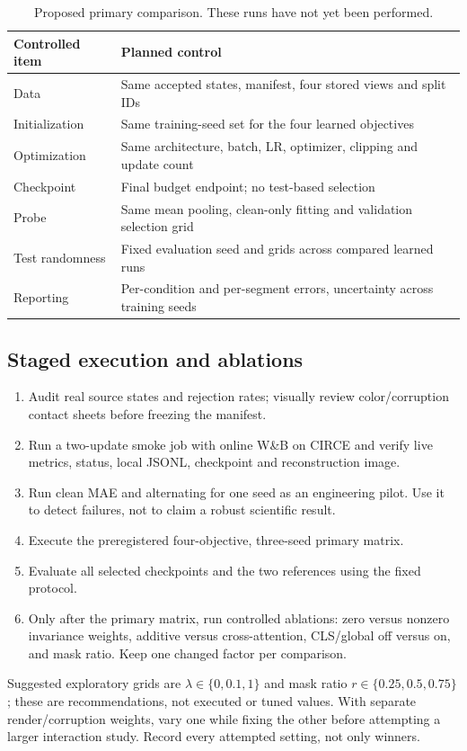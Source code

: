 \documentclass[11pt,a4paper]{article}
\begin{document}
\begin{table}[htbp]\centering\small
\begin{tabularx}{\linewidth}{lX}
\toprule Controlled item & Planned control \\\midrule
Data & Same accepted states, manifest, four stored views and split IDs \\
Initialization & Same training-seed set for the four learned objectives \\
Optimization & Same architecture, batch, LR, optimizer, clipping and update count \\
Checkpoint & Final budget endpoint; no test-based selection \\
Probe & Same mean pooling, clean-only fitting and validation selection grid \\
Test randomness & Fixed evaluation seed and grids across compared learned runs \\
Reporting & Per-condition and per-segment errors, uncertainty across training seeds \\\bottomrule
\end{tabularx}
\caption{Proposed primary comparison. These runs have not yet been performed.}
\end{table}

\subsection{Staged execution and ablations}
\begin{enumerate}
\item Audit real source states and rejection rates; visually review color/corruption
contact sheets before freezing the manifest.
\item Run a two-update smoke job with online W\&B on CIRCE and verify live metrics,
status, local JSONL, checkpoint and reconstruction image.
\item Run clean MAE and alternating for one seed as an engineering pilot. Use it to
detect failures, not to claim a robust scientific result.
\item Execute the preregistered four-objective, three-seed primary matrix.
\item Evaluate all selected checkpoints and the two references using the fixed protocol.
\item Only after the primary matrix, run controlled ablations: zero versus nonzero
invariance weights, additive versus cross-attention, CLS/global off versus on, and
mask ratio. Keep one changed factor per comparison.
\end{enumerate}
Suggested exploratory grids are $\lambda\in\{0,0.1,1\}$ and mask ratio
$r\in\{0.25,0.5,0.75\}$; these are recommendations, not executed or tuned values.
With separate render/corruption weights, vary one while fixing the other before
attempting a larger interaction study. Record every attempted setting, not only winners.
\end{document}
